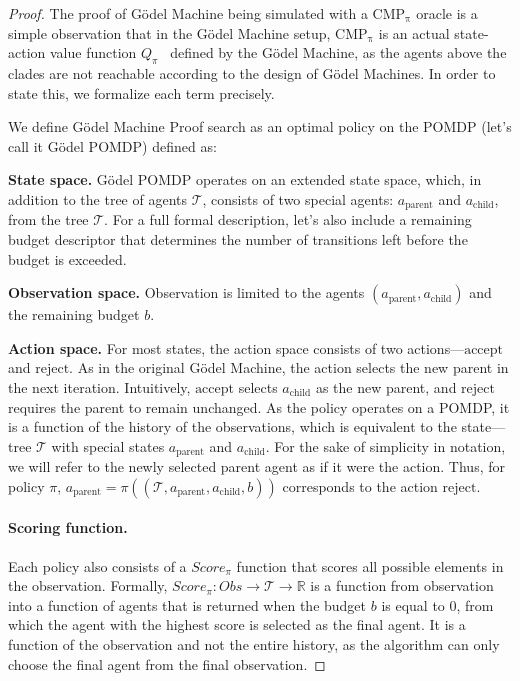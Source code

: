 \documentclass{article}
\begin{document}
\begin{proof}
The proof of G\"odel Machine being simulated with a $\mathrm{CMP_\pi}$ oracle is a simple observation that in the G\"odel Machine setup, $\mathrm{CMP_\pi}$ is an actual state-action value function $Q_\pi$~\citep{sutton1998reinforcement} defined by the G\"odel Machine, as the agents above the clades are not reachable according to the design of G\"odel Machines. In order to state this, we formalize each term precisely.


We define G\"odel Machine Proof search as an optimal policy on the POMDP (let's call it G\"odel POMDP) defined as:

\textbf{State space. } 
G\"odel POMDP operates on an extended state space, which, in addition to the tree of agents $\mathcal{T}$, consists of two special agents: $a_\text{parent} $ and $ a_\text{child}$, from the tree $\mathcal{T}$. For a full formal description, let's also include a remaining budget descriptor that determines the number of transitions left before the budget is exceeded. 

\textbf{Observation space.}
Observation is limited to the agents $(a_\text{parent}, a_\text{child})$ and the remaining budget $b$.

\textbf{Action space.}
For most states, the action space consists of two actions---$\text{accept}$ and $\text{reject}$. As in the original G\"odel Machine, the action selects the new parent in the next iteration. Intuitively, $\text{accept}$ selects $a_\text{child}$ as the new parent, and $\text{reject}$ requires the parent to remain unchanged. As the policy operates on a POMDP, it is a function of the history of the observations, which is equivalent to the state---tree $\mathcal{T}$ with special states $a_{\text{parent}}$ and $a_{\text{child}}$. For the sake of simplicity in notation, we will refer to the newly selected parent agent as if it were the action. Thus, for policy $\pi$, $a_\text{parent}= \pi((\mathcal{T}, a_\text{parent}, a_\text{child}, b))$ corresponds to the action $\text{reject}$.

\paragraph{Scoring function.}\label{app:indicator} Each policy also consists of a $Score_\pi$ function that scores all possible elements in the observation. Formally, $Score_\pi: Obs \rightarrow \mathcal{T} \rightarrow \mathbb{R}$ is a function from observation into a function of agents that is returned when the budget $b$ is equal to 0, from which the agent with the highest score is selected as the final agent. It is a function of the observation and not the entire history, as the algorithm can only choose the final agent from the final observation.



\end{proof}
\end{document}
